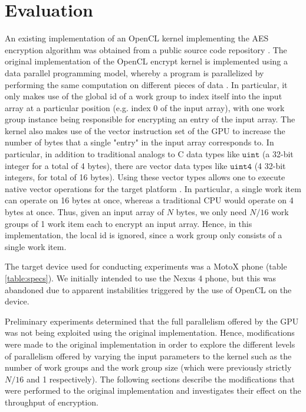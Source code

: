 \documentclass[conference,10pt]{IEEEtran}
\begin{document}

\section{Evaluation}

An existing implementation of an OpenCL kernel implementing the AES encryption algorithm was 
obtained from a public source code repository \cite{opencl_impl}.  The original implementation of 
the OpenCL encrypt kernel is implemented using a data parallel programming model, whereby a program 
is parallelized by performing the same computation on different pieces of data \cite{opencl_guide}.  
In particular, it only makes use of the global id of a work group to index itself into the input 
array at a particular position (e.g. index 0 of the input array), with one work group instance being 
responsible for encrypting an entry of the input array. The kernel also makes use of the vector 
instruction set of the GPU to increase the number of bytes that a single "entry" in the input array 
corresponds to. In particular, in addition to traditional analogs to C data types like 
$\mathtt{uint}$ (a 32-bit integer for a total of 4 bytes), there are vector data types like 
$\mathtt{uint4}$ (4 32-bit integers, for total of 16 bytes). Using these vector types allows one to 
execute native vector operations for the target platform \cite{opencl_guide}.  In particular, a 
single work item can operate on 16 bytes at once, whereas a traditional CPU would operate on 4 bytes 
at once. Thus, given an input array of $N$ bytes, we only need $N/16$ work groups of 1 work item 
each to encrypt an input array. Hence, in this implementation, the local id is ignored, since a work 
group only consists of a single work item.

The target device used for conducting experiments was a MotoX phone \cite{specs} (table \ref{table:specs}).  We 
initially intended to use the Nexus 4 phone, but this was abandoned due to apparent instabilities 
triggered by the use of OpenCL on the device. 

Preliminary experiments determined that the full parallelism offered by the GPU was not being 
exploited using the original implementation.  Hence, modifications were made to the original 
implementation in order to explore the different levels of parallelism offered by varying the input 
parameters to the kernel such as the number of work groups and the work group size (which were 
previously strictly $N/16$ and 1 respectively).  The following sections describe the modifications 
that were performed to the original implementation and investigates their effect on the throughput 
of encryption.
\end{document}

